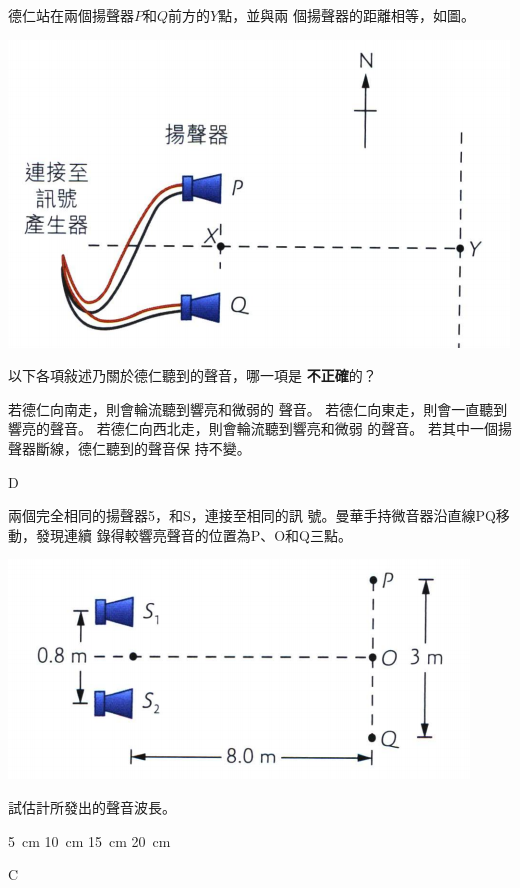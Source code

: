 {
    德仁站在兩個揚聲器$P$和$Q$前方的$Y$點，並與兩 個揚聲器的距離相等，如圖。
    \par{\par\centering\includegraphics[width=.4\textwidth]{./img/ch3_earlyclass_wave_mc_2024-05-14-12-29-34.png}\par}
    以下各項敍述乃關於德仁聽到的聲音，哪一項是 \textbf{不正確}的？
    \begin{tasks}
        \task 若德仁向南走，則會輪流聽到響亮和微弱的 聲音。
        \task 若德仁向東走，則會一直聽到響亮的聲音。
        \task 若德仁向西北走，則會輪流聽到響亮和微弱 的聲音。
        \task 若其中一個揚聲器斷線，德仁聽到的聲音保 持不變。
    \end{tasks}

}{\mckey D}
{
    兩個完全相同的揚聲器5，和S，連接至相同的訊 號。曼華手持微音器沿直線PQ移動，發現連續 錄得較響亮聲音的位置為P、O和Q三點。
    \par{\par\centering\includegraphics[width=.4\textwidth]{./img/ch3_earlyclass_wave_mc_2024-05-14-13-16-30.png}\par}
    試估計所發出的聲音波長。
    \begin{tasks}
        \task \qty{5}{cm}
        \task \qty{10}{cm}
        \task \qty{15}{cm}
        \task \qty{20}{cm}
    \end{tasks}
}{\mckey C}


